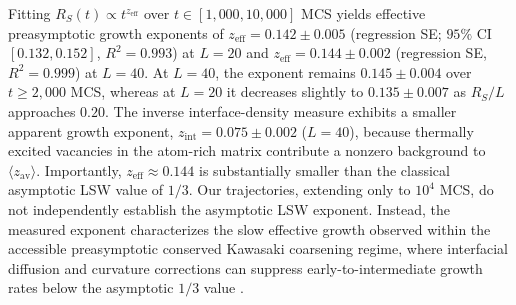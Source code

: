 \documentclass[aps,pre,reprint,superscriptaddress,amsmath,amssymb,floatfix]{revtex4-2}
\begin{document}
Fitting $R_S(t) \propto t^{z_{\mathrm{eff}}}$ over $t \in [1{,}000, 10{,}000]$ MCS yields effective preasymptotic growth exponents of $z_{\mathrm{eff}} = 0.142 \pm 0.005$ (regression SE; $95\%$ CI $[0.132, 0.152]$, $R^2 = 0.993$) at $L = 20$ and $z_{\mathrm{eff}} = 0.144 \pm 0.002$ (regression SE, $R^2 = 0.999$) at $L = 40$. At $L = 40$, the exponent remains $0.145 \pm 0.004$ over $t \geq 2{,}000$ MCS, whereas at $L = 20$ it decreases slightly to $0.135 \pm 0.007$ as $R_S/L$ approaches $0.20$. The inverse interface-density measure exhibits a smaller apparent growth exponent, $z_{\mathrm{int}} = 0.075 \pm 0.002$ ($L = 40$), because thermally excited vacancies in the atom-rich matrix contribute a nonzero background to $\langle z_{\mathrm{av}}\rangle$. Importantly, $z_{\mathrm{eff}} \approx 0.144$ is substantially smaller than the classical asymptotic LSW value of $1/3$. Our trajectories, extending only to $10^4$ MCS, do not independently establish the asymptotic LSW exponent. Instead, the measured exponent characterizes the slow effective growth observed within the accessible preasymptotic conserved Kawasaki coarsening regime, where interfacial diffusion and curvature corrections can suppress early-to-intermediate growth rates below the asymptotic $1/3$ value \cite{Huse1986,Amar1988,Majumder2011}.
\end{document}
